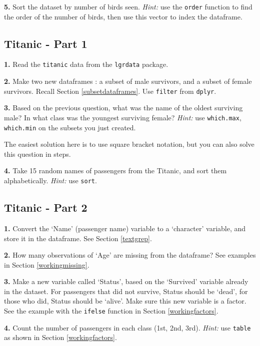 \documentclass[]{book}
\begin{document}
\textbf{5.} Sort the dataset by number of birds seen. \emph{Hint:} use the \texttt{order} function to find the order of the number of birds, then use this vector to index the dataframe.

\hypertarget{titanic---part-1}{%
\subsection{Titanic - Part 1}\label{titanic---part-1}}

\textbf{1.} Read the \texttt{titanic} data from the \texttt{lgrdata} package.

\textbf{2.} Make two new dataframes : a subset of male survivors, and a subset of female survivors. Recall Section \ref{subsetdataframes}. Use \texttt{filter} from \texttt{dplyr}.

\textbf{3.} Based on the previous question, what was the name of the oldest surviving male? In what class was the youngest surviving female? \emph{Hint:} use \texttt{which.max}, \texttt{which.min} on the subsets you just created.

The easiest solution here is to use square bracket notation, but you can also solve this question in steps.

\textbf{4.} Take 15 random names of passengers from the Titanic, and sort them alphabetically. \emph{Hint:} use \texttt{sort}.

\hypertarget{titanic---part-2}{%
\subsection{Titanic - Part 2}\label{titanic---part-2}}

\textbf{1.} Convert the `Name' (passenger name) variable to a `character' variable, and store it in the dataframe. See Section \ref{textgrep}.

\textbf{2.} How many observations of `Age' are missing from the dataframe? See examples in Section \ref{workingmissing}.

\textbf{3.} Make a new variable called `Status', based on the `Survived' variable already in the dataset. For passengers that did not survive, Status should be `dead', for those who did, Status should be `alive'. Make sure this new variable is a factor. See the example with the \texttt{ifelse} function in Section \ref{workingfactors}.

\textbf{4.} Count the number of passengers in each class (1st, 2nd, 3rd). \emph{Hint:} use \texttt{table} as shown in Section \ref{workingfactors}.
\end{document}
